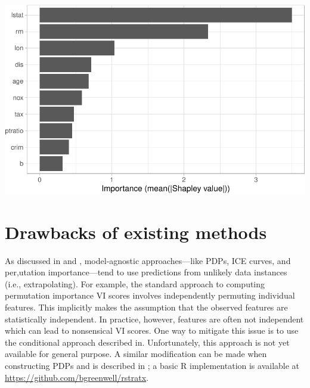 \begin{Schunk}


\begin{center}\includegraphics[width=0.7\linewidth]{greenwell-boehmke_files/figure-latex/vi-shap-1} \end{center}

\end{Schunk}

\section{Drawbacks of existing methods}

As discussed in \citet{hooker-2019-stop} and
\citet[chap. 5]{molnar-2019-iml}, model-agnostic approaches---like PDPs,
ICE curves, and per,utation importance---tend to use predictions from
unlikely data instances (i.e., extrapolating). For example, the standard
approach to computing permutation importance VI scores involves
independently permuting individual features. This implicitly makes the
assumption that the observed features are statistically independent. In
practice, however, features are often not independent which can lead to
nonsensical VI scores. One way to mitigate this issue is to use the
conditional approach described in\citet{strobl-2019-conditional}.
Unfortunately, this approach is not yet available for general purpose. A
similar modification can be made when constructing PDPs and is described
in \citet{parr-2019-technical}; a basic R implementation is available at
\url{https://github.com/bgreenwell/rstratx}.

